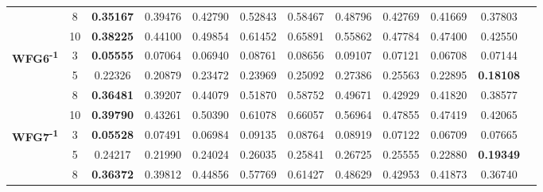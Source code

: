 \documentclass{sig-alternate}
\begin{document}
\begin{table}[!htb]
\begin{tabular}{|c|c|c|c|c|c|c|c|c|c|c|c|}
                                                      & 8          & \textbf{0.35167} & 0.39476           & 0.42790               & 0.52843          & 0.58467             & 0.48796             & 0.42769            & 0.41669              & 0.37803          \\ \cline{2-11} 
                                                      & 10         & \textbf{0.38225} & 0.44100           & 0.49854               & 0.61452          & 0.65891             & 0.55862             & 0.47784            & 0.47400              & 0.42550          \\ \hline
\multirow{4}{*}{\textbf{WFG6\textsuperscript{-1}}}  & 3          & \textbf{0.05555} & 0.07064           & 0.06940               & 0.08761          & 0.08656             & 0.09107             & 0.07121            & 0.06708              & 0.07144          \\ \cline{2-11} 
                                                      & 5          & 0.22326          & 0.20879           & 0.23472               & 0.23969          & 0.25092             & 0.27386             & 0.25563            & 0.22895              & \textbf{0.18108} \\ \cline{2-11} 
                                                      & 8          & \textbf{0.36481} & 0.39207           & 0.44079               & 0.51870          & 0.58752             & 0.49671             & 0.42929            & 0.41820              & 0.38577          \\ \cline{2-11} 
                                                      & 10         & \textbf{0.39790} & 0.43261           & 0.50390               & 0.61078          & 0.66057             & 0.56964             & 0.47855            & 0.47419              & 0.42065          \\ \hline
\multirow{4}{*}{\textbf{WFG7\textsuperscript{-1}}}  & 3          & \textbf{0.05528} & 0.07491           & 0.06984               & 0.09135          & 0.08764             & 0.08919             & 0.07122            & 0.06709              & 0.07665          \\ \cline{2-11} 
                                                      & 5          & 0.24217          & 0.21990           & 0.24024               & 0.26035          & 0.25841             & 0.26725             & 0.25555            & 0.22880              & \textbf{0.19349} \\ \cline{2-11} 
                                                      & 8          & \textbf{0.36372} & 0.39812           & 0.44856               & 0.57769          & 0.61427             & 0.48629             & 0.42953            & 0.41873              & 0.36740          \\ \cline{2-11} 

\end{tabular}
\end{table}
\end{document}
